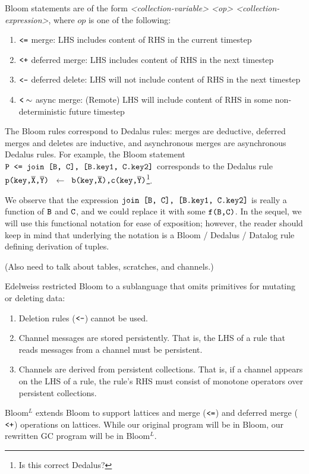 \documentclass{article}
\numberwithin{equation}{section}
\renewcommand{\tt}[1]{\ifmmode\text{\texttt{#1}}\else\texttt{#1}\fi}
\begin{document}
Bloom statements are of the form \textit{<collection-variable> <op> <collection-expression>}, where $op$ is one of the following:
\begin{enumerate}
\item $\tt{<=}$ merge: LHS includes content of RHS in the current timestep
\item $\tt{<+}$ deferred merge: LHS includes content of RHS in the next timestep
\item $\tt{<-}$ deferred delete: LHS will not include content of RHS in the next timestep
\item $\tt{<}\sim$ async merge: (Remote) LHS will include content of RHS in some non-deterministic future timestep
\end{enumerate}
The Bloom rules correspond to Dedalus rules: merges are deductive, deferred merges and deletes are inductive, and asynchronous merges are asynchronous Dedalus rules.
For example, the Bloom statement $\tt{P <= join [B, C], [B.key1, C.key2]}$ corresponds to the Dedalus rule $\tt{p(key,}\overline{\tt{X}}\tt{,}\overline{\tt{Y}}\tt{)}$ $~\leftarrow~$ $\tt{b(key,}\overline{\tt{X}}\tt{),$ $c(key,}\overline{\tt{Y}}\tt{)}$\footnote{Is this correct Dedalus?}.

We observe that the expression $\tt{join [B, C], [B.key1, C.key2]}$ is really a function of $\tt{B}$ and $\tt{C}$, and we could replace it with some $\tt{f(B,C)}$.
In the sequel, we will use this functional notation for ease of exposition; however, the reader should keep in mind that underlying the notation is a Bloom / Dedalus / Datalog rule defining derivation of tuples.

(Also need to talk about tables, scratches, and channels.)

Edelweiss restricted Bloom to a sublanguage that omits primitives for mutating or deleting data:
\begin{enumerate}
\item Deletion rules ($\tt{<-}$) cannot be used.
\item Channel messages are stored persistently. That is, the LHS of a rule that reads messages from a channel must be persistent.
\item Channels are derived from persistent collections. That is, if a channel appears on the LHS of a rule, the rule's RHS must consist of monotone operators over persistent collections.
\end{enumerate}

Bloom$^L$ extends Bloom to support lattices and merge ($\tt{<=}$) and deferred merge ($\tt{<+}$) operations on lattices.
While our original program will be in Bloom, our rewritten GC program will be in  Bloom$^L$.
\end{document}
